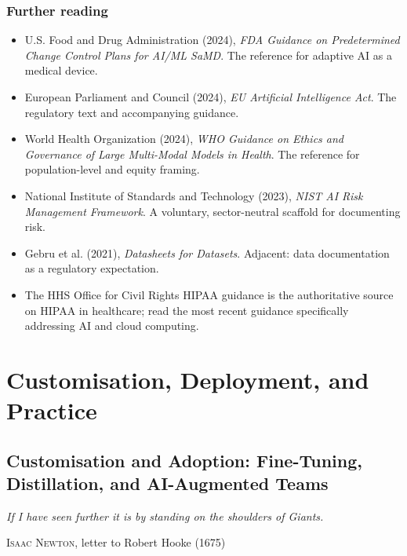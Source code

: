 \documentclass[
  letterpaper,
  11pt]{scrbook}
\providecommand{\tightlist}{%
  \setlength{\itemsep}{0pt}\setlength{\parskip}{0pt}}
\begin{document}
\section{Further reading}\label{further-reading-11}

\begin{itemize}
\tightlist
\item
  U.S. Food and Drug Administration (2024), \emph{FDA Guidance on
  Predetermined Change Control Plans for AI/ML SaMD}. The reference for
  adaptive AI as a medical device.
\item
  European Parliament and Council (2024), \emph{EU Artificial
  Intelligence Act}. The regulatory text and accompanying guidance.
\item
  World Health Organization (2024), \emph{WHO Guidance on Ethics and
  Governance of Large Multi-Modal Models in Health}. The reference for
  population-level and equity framing.
\item
  National Institute of Standards and Technology (2023), \emph{NIST AI
  Risk Management Framework}. A voluntary, sector-neutral scaffold for
  documenting risk.
\item
  Gebru et al. (2021), \emph{Datasheets for Datasets}. Adjacent: data
  documentation as a regulatory expectation.
\item
  The HHS Office for Civil Rights HIPAA guidance is the authoritative
  source on HIPAA in healthcare; read the most recent guidance
  specifically addressing AI and cloud computing.
\end{itemize}

\part{Customisation, Deployment, and Practice}

\chapter{Customisation and Adoption: Fine-Tuning, Distillation, and
AI-Augmented Teams}\label{sec-customisation-teams}

\begin{flushright}\small

\emph{If I have seen further it is by standing on the shoulders of
Giants.}

\textsc{Isaac Newton}, letter to Robert Hooke (1675)

\end{flushright}
\end{document}
